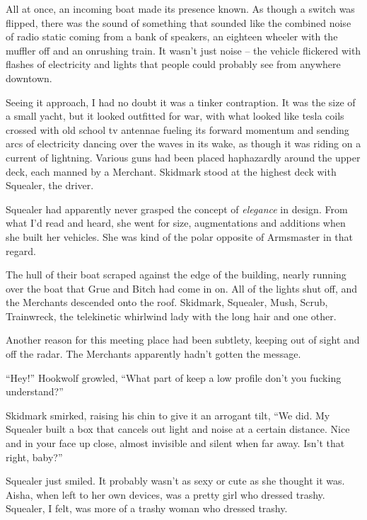 All at once, an incoming boat made its presence known.  As though a switch was flipped, there was the sound of something that sounded like the combined noise of radio static coming from a bank of speakers, an eighteen wheeler with the muffler off and an onrushing train.  It wasn't just noise – the vehicle flickered with flashes of electricity and lights that people could probably see from anywhere downtown.



Seeing it approach, I had no doubt it was a tinker contraption.  It was the size of a small yacht, but it looked outfitted for war, with what looked like tesla coils crossed with old school tv antennae fueling its forward momentum and sending arcs of electricity dancing over the waves in its wake, as though it was riding on a current of lightning.  Various guns had been placed haphazardly around the upper deck, each manned by a Merchant.  Skidmark stood at the highest deck with Squealer, the driver.



Squealer had apparently never grasped the concept of \emph{elegance} in design.  From what I'd read and heard, she went for size, augmentations and additions when she built her vehicles.  She was kind of the polar opposite of Armsmaster in that regard.



The hull of their boat scraped against the edge of the building, nearly running over the boat that Grue and Bitch had come in on.  All of the lights shut off, and the Merchants descended onto the roof.  Skidmark, Squealer, Mush, Scrub, Trainwreck, the telekinetic whirlwind lady with the long hair and one other.



Another reason for this meeting place had been subtlety, keeping out of sight and off the radar.  The Merchants apparently hadn't gotten the message.



``Hey!'' Hookwolf growled, ``What part of keep a low profile don't you fucking understand?''



Skidmark smirked, raising his chin to give it an arrogant tilt, ``We did.  My Squealer built a box that cancels out light and noise at a certain distance.  Nice and in your face up close, almost invisible and silent when far away.  Isn't that right, baby?''



Squealer just smiled.  It probably wasn't as sexy or cute as she thought it was.  Aisha, when left to her own devices, was a pretty girl who dressed trashy.  Squealer, I felt, was more of a trashy woman who dressed trashy.




